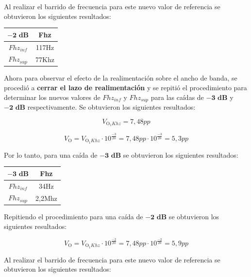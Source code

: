Al realizar el barrido de frecuencia para este nuevo valor de referencia se obtuvieron los siguientes resultados:


\begin{center}
\begin{tabular}{|c|c|}
\hline
 $\mathbf{-2\text{ dB}}$ & Fhz  \\
\hline
$Fhz_{inf}$ & 117Hz  \\
\hline
$Fhz_{sup}$ &  77Khz \\
\hline
\end{tabular}
\end{center}

Ahora para observar el efecto de la realimentación sobre el ancho de banda, se procedió a \textbf{cerrar el lazo de realimentación} y se repitió el procedimiento para determinar los nuevos valores de $Fhz_{inf}$ y $Fhz_{sup}$ para las caídas de $\mathbf{-3\text{ dB}}$ y $\mathbf{-2\text{ dB}}$ respectivamente. Se obtuvieron los siguientes resultados:


\begin{equation*}
 V_{\text{O}_1Khz} = 7,48pp
\end{equation*}

\begin{equation*}
V_{\text{O}} = V_{\text{O}_1Khz} \cdot 10^{\frac{-3}{20}} = 7,48pp \cdot 10^{\frac{-3}{20}} = 5,3pp
\end{equation*}

Por lo tanto, para una caída de $\mathbf{-3\text{ dB}}$ se obtuvieron los siguientes resultados:

\begin{center}
\begin{tabular}{|c|c|}
\hline
 $\mathbf{-3\text{ dB}}$ & Fhz  \\
\hline
$Fhz_{inf}$ & 34Hz  \\
\hline
$Fhz_{sup}$ &  2,2Mhz \\
\hline
\end{tabular}
\end{center}

Repitiendo el procedimiento para una caída de $\mathbf{-2\text{ dB}}$ se obtuvieron los siguientes resultados:


\begin{equation*}
V_{\text{O}} = V_{\text{O}_1Khz} \cdot 10^{\frac{-2}{20}} = 7,48pp \cdot 10^{\frac{-2}{20}} = 5,9pp
\end{equation*}

Al realizar el barrido de frecuencia para este nuevo valor de referencia se obtuvieron los siguientes resultados:

